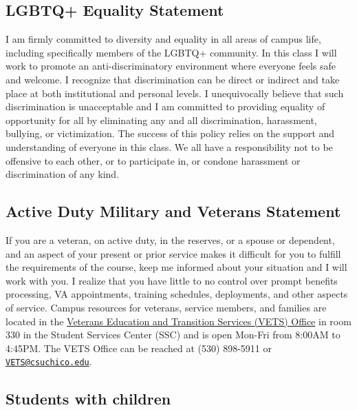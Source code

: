 \documentclass[11pt,]{article}
\begin{document}
\hypertarget{lgbtq-equality-statement}{%
\subsection{LGBTQ+ Equality Statement}\label{lgbtq-equality-statement}}

I am firmly committed to diversity and equality in all areas of campus
life, including specifically members of the LGBTQ+ community. In this
class I will work to promote an anti-discriminatory environment where
everyone feels safe and welcome. I recognize that discrimination can be
direct or indirect and take place at both institutional and personal
levels. I unequivocally believe that such discrimination is unacceptable
and I am committed to providing equality of opportunity for all by
eliminating any and all discrimination, harassment, bullying, or
victimization. The success of this policy relies on the support and
understanding of everyone in this class. We all have a responsibility
not to be offensive to each other, or to participate in, or condone
harassment or discrimination of any kind.

\hypertarget{active-duty-military-and-veterans-statement}{%
\subsection{Active Duty Military and Veterans
Statement}\label{active-duty-military-and-veterans-statement}}

If you are a veteran, on active duty, in the reserves, or a spouse or
dependent, and an aspect of your present or prior service makes it
difficult for you to fulfill the requirements of the course, keep me
informed about your situation and I will work with you. I realize that
you have little to no control over prompt benefits processing, VA
appointments, training schedules, deployments, and other aspects of
service. Campus resources for veterans, service members, and families
are located in the
\href{https://www.csuchico.edu/vets/index.shtml}{Veterans Education and
Transition Services (VETS) Office} in room 330 in the Student Services
Center (SSC) and is open Mon-Fri from 8:00AM to 4:45PM. The VETS Office
can be reached at (530) 898-5911 or
\href{mailto:VETS@csuchico.edu}{\nolinkurl{VETS@csuchico.edu}}.

\hypertarget{students-with-children}{%
\subsection{Students with children}\label{students-with-children}}
\end{document}
